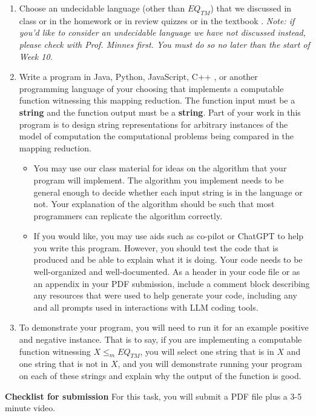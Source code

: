 \begin{enumerate}
\item Choose an undecidable language (other than $EQ_{TM}$) that 
we discussed in class or in the homework
or in review quizzes or in the textbook . {\it Note:
if you'd like to consider an undecidable language we have not discussed instead, 
please check with Prof. Minnes first. 
You must do so no later than the start of Week 10.}
\item Write a program in Java, Python, JavaScript, C++ , or another programming language of your choosing that implements a computable function witnessing this mapping reduction.  The function input must be a {\bf string}  and the function 
output must be a {\bf string}. Part of your work in this program 
is to design string representations for arbitrary instances of the model of 
computation the computational problems being compared in the mapping reduction.
\begin{itemize}
   \item You may use our class material for ideas on the algorithm that your program will implement. The algorithm you implement needs to be general enough to decide whether each input string is in the language or not. Your explanation of the algorithm should be such that most programmers can replicate the algorithm correctly.
   \item If you would like, you may use aids such as co-pilot or ChatGPT to help you write this program. 
   However, you should test the code that is produced and be able to explain what it is doing. Your code needs to be well-organized and well-documented.
   As a header in your code file or as an appendix in your PDF submission, include a comment block describing any resources that were used to 
   help generate your code, including any and all prompts used in interactions 
   with LLM coding tools.
\end{itemize}

\item To demonstrate your program, you will need to run it for an example positive and negative instance. That is to say, if you are implementing 
a computable function witnessing $X \leq_m EQ_{TM}$, you will select one string that is in $X$ and one string that is not in $X$, and you will 
 demonstrate running your program on each of these strings and explain why 
 the output of the function is good.
\end{enumerate}

\newpage

{\bf Checklist for submission} For this task, you will submit a PDF file plus a 3-5 minute video.

